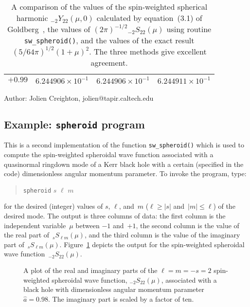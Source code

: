 \begin{table}[h]
\begin{center}
\begin{tabular}{|cccc|}
  $+0.99$ & $6.244906\times10^{-1}$ & $6.244906\times10^{-1}$
          & $6.244911\times10^{-1}$ \\
  \hline
\end{tabular}
\end{center}
\caption{\label{t:spherical harmonic}
  A comparison of the values of the spin-weighted spherical harmonic
  ${}_{-2}Y_{22}(\mu,0)$ calculated by equation~(3.1) of
  Goldberg~\protect\cite{goldberg:1967}, the values of
  $(2\pi)^{-1/2}{}_{-2}S_{22}(\mu)$ using routine \texttt{sw\_spheroid()},
  and the values of the exact result $(5/64\pi)^{1/2}(1+\mu)^2$.  The three
  methods give excellent agreement.}
\end{table}

\clearpage
{}

\begin{description}
\item{Author:} Jolien Creighton, jolien@tapir.caltech.edu
\end{description}


\clearpage
\subsection{Example: \texttt{spheroid} program}

This is a second implementation of the function \texttt{sw\_spheroid()}
which is used to compute the spin-weighted spheroidal wave function
associated with a quasinormal ringdown mode of a Kerr black hole with
a certain (specified in the code) dimensionless angular momentum parameter.  
To invoke the program, type:
\begin{quote}
  \texttt{spheroid} $s$ $\ell$ $m$
\end{quote}
for the desired (integer) values of $s$, $\ell$, and~$m$
($\ell\ge|s|$ and~$|m|\le\ell$) of the desired mode.
The output is three columns of data: the
first column is the independent variable~$\mu$ between $-1$ and~$+1$, the
second column is the value of the real part of~${}_sS_{\ell m}(\mu)$, and the
third column is the value of the imaginary part of~${}_sS_{\ell m}(\mu)$.
Figure~\ref{f:spheroid} depicts the output for the spin-weighted spheroidal
wave function~${}_{-2}S_{22}(\mu)$.

\begin{figure}[h]
\begin{center}
\caption{\label{f:spheroid} A plot of the real and imaginary parts of the
  $\ell=m=-s=2$ spin-weighted spheroidal wave function, ${}_{-2}S_{22}(\mu)$,
  associated with a black hole with dimensionless angular momentum
  parameter~$\hat{a}=0.98$.  The imaginary part is scaled by a factor of ten.}
\end{center}
\end{figure}


